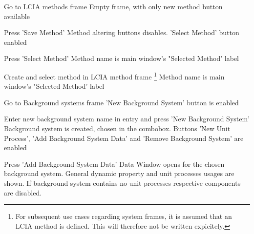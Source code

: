 {
\step
{Go to LCIA methods frame}
{Empty frame, with only new method button available}

\placeholder

\step
{Press 'Save Method'}
{Method altering buttons disables. 'Select Method' button enabled}

\step
{Press 'Select Method'}
{Method name is main window's "Selected Method' label}
}





{
\step
{Create and select method in LCIA method frame} \footnote{For subsequent use cases regarding system frames, it is assumed that an LCIA method is defined. This will therefore not be written expicitely.}
{Method name is main window's "Selected Method' label}

\step
{Go to Background systems frame}
{'New Background System' button is enabled}

\step
{Enter new background system name in entry and press 'New Background System'}
{Background system is created, chosen in the combobox. Buttons 'New Unit Process', 'Add Background System Data' and 'Remove Background System' are enabled}

\placeholder

\step
{Press 'Add Background System Data'}
{Data Window opens for the chosen background system. General dynamic property and unit processes usages are shown. If background system contains no unit processes respective components are disabled.}
}





